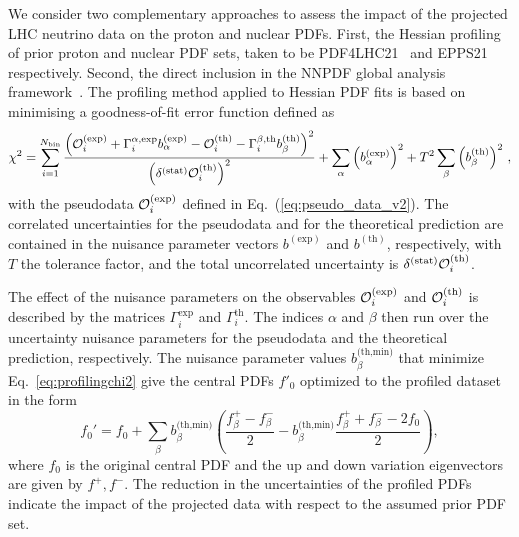 We consider two complementary approaches to assess the
impact of the projected LHC neutrino data on the proton and nuclear PDFs.
%
First, the Hessian profiling\cite{Paukkunen:2014zia, Schmidt:2018hvu, AbdulKhalek:2018rok, HERAFitterdevelopersTeam:2015cre} of prior proton and
nuclear PDF sets, taken to be PDF4LHC21~\cite{PDF4LHCWorkingGroup:2022cjn} and
EPPS21~\cite{Eskola:2021nhw} respectively.
%
Second, the direct inclusion 
in the NNPDF global analysis framework~\cite{NNPDF:2021uiq,NNPDF:2021njg}.
%
The profiling method applied to Hessian PDF fits is based
on minimising a goodness-of-fit error function defined as
\begin{equation}
\chi^2 = 
\sum_{i=1}^{N_{\textrm{bin}}} 
{{\left(  \mathcal{O}_i^{\rm (exp)}
            + \Gamma_i^{\alpha,\textrm{exp}}
              b_\alpha^{\textrm{(exp)}}
            - \mathcal{O}_i^{\rm (th)}
            - \Gamma_i^{\beta,\textrm{th}}
              b_\beta^{(\textrm{th})}
     \right)^2
     }\over { \left(\delta^{{\rm (stat)}}\mathcal{O}_i^{\rm (th)}\right)^2 }}
+ \sum_\alpha \left( b_\alpha^{(\textrm{exp})}\right)^2
+ T^2 \sum_\beta  \left( b_\beta^{\textrm{(th)}}\right) ^2 \, ,
\label{eq:profilingchi2}
\end{equation}
with the pseudodata 
$\mathcal{O}_i^{\rm (exp)}$ defined in  Eq.~(\ref{eq:pseudo_data_v2}).
%
The correlated uncertainties for the pseudodata and for the theoretical prediction 
are contained in the nuisance parameter vectors $b^{(\textrm{exp})}$ and $b^{(\textrm{th})}$, respectively, with $T$ the tolerance factor, and the total uncorrelated uncertainty is $\delta^{{\rm (stat)}}\mathcal{O}_i^{\rm (th)}$.

The effect of the nuisance parameters
on the observables $\mathcal{O}_i^{\rm (exp)}$ and $\mathcal{O}_i^{\rm (th)}$
is described by the matrices $\Gamma_i^{\textrm{exp}}$ and $\Gamma_i^{\textrm{th}}$.
%
The indices $\alpha$ and $\beta$ then run over the uncertainty nuisance parameters for the pseudodata and the theoretical prediction, respectively.
%
The nuisance parameter values $b_\beta^{\textrm{(th,min)}}$ that minimize Eq.~\eqref{eq:profilingchi2} give the central PDFs $f'_0$ optimized to the profiled dataset in the form
\begin{equation}
f_0' = f_0
      + \sum_\beta b_\beta^{\textrm{(th,min)}} 
        \left(  \frac{f_\beta^+   -  f_\beta^- }{2}
              -    b_\beta^{\textrm{(th,min)}}
                \frac{f_\beta^+ + f_\beta^- - 2f_0}{2}
        \right),
\end{equation}
where $f_0$ is the original central PDF and the up and down variation eigenvectors are given by $f^+, f^-$.
%
The reduction in the uncertainties of the profiled PDFs indicate the impact
of the projected data with respect to the assumed prior PDF set.

